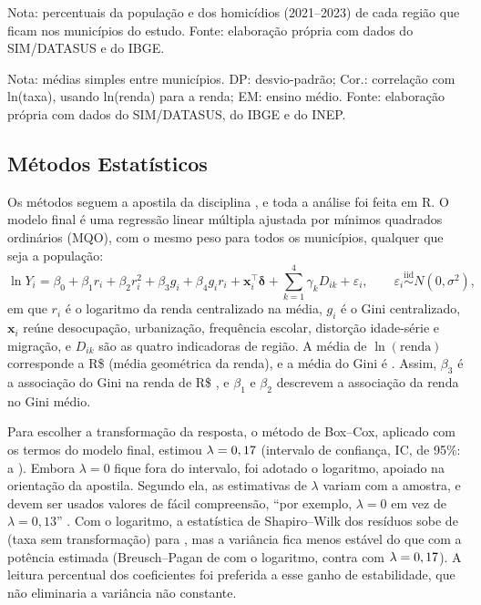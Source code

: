 \documentclass[a4paper,11pt]{article}
\newcommand{\fonteSI}{Fonte: elaboração própria com dados do SIM/DATASUS e do IBGE.}
\newcommand{\fonte}{Fonte: elaboração própria com dados do SIM/DATASUS, do IBGE e do INEP.}
\newcommand{\nota}[2][\fonte]{\par\vspace{2pt}\begin{minipage}{\linewidth}\footnotesize Nota: #2 #1\end{minipage}}
\begin{document}
\begin{table}[!htb]
\centering
\caption{Municípios, população e homicídios no estudo, por região}
\label{tab:escopo}
\small
%
\nota[\fonteSI]{percentuais da população e dos homicídios (2021--2023) de cada região que ficam nos municípios do estudo.}
\end{table}

\begin{table}[!htb]
\centering
\caption{Estatísticas descritivas dos \nMunEsc{} municípios do estudo}
\label{tab:descritiva}
\small
\setlength{\tabcolsep}{4pt}
%
\nota{médias simples entre municípios. DP: desvio-padrão; Cor.: correlação com ln(taxa), usando ln(renda) para a renda; EM: ensino médio.}
\end{table}

\subsection{Métodos Estatísticos}

Os métodos seguem a apostila da disciplina \citep{ferrari2023}, e toda a análise foi feita em R. O modelo final é uma regressão linear múltipla ajustada por mínimos quadrados ordinários (MQO), com o mesmo peso para todos os municípios, qualquer que seja a população:
\begin{equation}
\ln Y_i = \beta_0 + \beta_1 r_i + \beta_2 r_i^2 + \beta_3 g_i + \beta_4 g_i r_i + \mathbf{x}_i^{\top}\bm{\delta} + \sum_{k=1}^{4} \gamma_k D_{ik} + \varepsilon_i,
\qquad \varepsilon_i \overset{\text{iid}}{\sim} N(0, \sigma^2),
\label{eq:modelo}
\end{equation}
em que $r_i$ é o logaritmo da renda centralizado na média, $g_i$ é o Gini centralizado, $\mathbf{x}_i$ reúne desocupação, urbanização, frequência escolar, distorção idade-série e migração, e $D_{ik}$ são as quatro indicadoras de região. A média de $\ln(\text{renda})$ corresponde a R\$ \nCentroRenda{} (média geométrica da renda), e a média do Gini é \nCentroGini. Assim, $\beta_3$ é a associação do Gini na renda de R\$ \nCentroRenda, e $\beta_1$ e $\beta_2$ descrevem a associação da renda no Gini médio.

Para escolher a transformação da resposta, o método de Box--Cox, aplicado com os termos do modelo final, estimou $\lambda = 0,17$ (intervalo de confiança, IC, de 95\%: \nLambdaFinalInf{} a \nLambdaFinalSup). Embora $\lambda = 0$ fique fora do intervalo, foi adotado o logaritmo, apoiado na orientação da apostila. Segundo ela, as estimativas de $\lambda$ variam com a amostra, e devem ser usados valores de fácil compreensão, ``por exemplo, $\lambda = 0$ em vez de $\lambda = 0,13$'' \citep[cap.~4]{ferrari2023}. Com o logaritmo, a estatística de Shapiro--Wilk dos resíduos sobe de \nSWy{} (taxa sem transformação) para \nSWln, mas a variância fica menos estável do que com a potência estimada (Breusch--Pagan de \nBP{} com o logaritmo, contra \nBPlambda{} com $\lambda = 0,17$). A leitura percentual dos coeficientes foi preferida a esse ganho de estabilidade, que não eliminaria a variância não constante.
\end{document}

